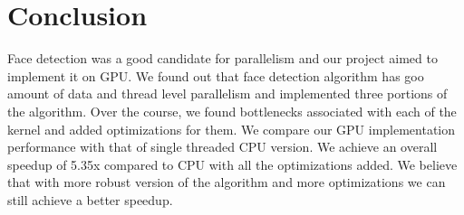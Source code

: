 \section{Conclusion}\label{sec:conc}

Face detection was a good candidate for parallelism and our project aimed to 
implement it on GPU. We found out that face detection algorithm has goo amount of data and
thread level parallelism and implemented three portions of the algorithm. Over the course, we found bottlenecks associated with each of the kernel
and added optimizations for them. We compare our GPU implementation performance with that of single threaded CPU version.
We achieve an overall speedup of 5.35x compared to CPU with all the optimizations added. We believe that with more robust version of the algorithm 
and more optimizations we can still achieve a better speedup. 
